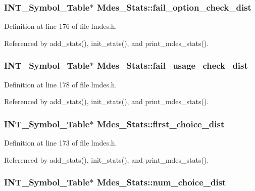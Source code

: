 \subsubsection{\setlength{\rightskip}{0pt plus 5cm}\bf{INT\_\-Symbol\_\-Table}$\ast$ \bf{Mdes\_\-Stats::fail\_\-option\_\-check\_\-dist}}\label{structMdes__Stats_4b5dedb4736c52674547ae68a0c59f78}




Definition at line 176 of file lmdes.h.

Referenced by add\_\-stats(), init\_\-stats(), and print\_\-mdes\_\-stats().
\subsubsection{\setlength{\rightskip}{0pt plus 5cm}\bf{INT\_\-Symbol\_\-Table}$\ast$ \bf{Mdes\_\-Stats::fail\_\-usage\_\-check\_\-dist}}\label{structMdes__Stats_7880416ff9053ece400bbe7b5ab8015c}




Definition at line 178 of file lmdes.h.

Referenced by add\_\-stats(), init\_\-stats(), and print\_\-mdes\_\-stats().
\subsubsection{\setlength{\rightskip}{0pt plus 5cm}\bf{INT\_\-Symbol\_\-Table}$\ast$ \bf{Mdes\_\-Stats::first\_\-choice\_\-dist}}\label{structMdes__Stats_ade44a96c63dd3abdb9b4a6c71022a01}




Definition at line 173 of file lmdes.h.

Referenced by add\_\-stats(), init\_\-stats(), and print\_\-mdes\_\-stats().
\subsubsection{\setlength{\rightskip}{0pt plus 5cm}\bf{INT\_\-Symbol\_\-Table}$\ast$ \bf{Mdes\_\-Stats::num\_\-choice\_\-dist}}\label{structMdes__Stats_b87e3703793b265a4c0965a5ceb2c26e}





